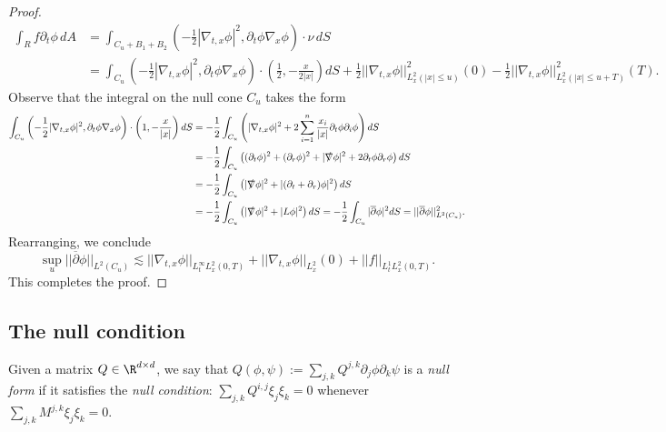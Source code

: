 \begin{proof}
		\begin{align*}
			\int_R f \partial_t \phi \, dA
				& = \int_{C_{u} + B_1 + B_2} \left( -\frac12 |\nabla_{t, x} \phi|^2, \partial_t \phi \nabla_x \phi \right) \cdot \nu \, dS \\
				&= \int_{C_{u}} \left( -\frac12 |\nabla_{t, x} \phi|^2, \partial_t \phi \nabla_x \phi \right) \cdot  \left( \frac12, -\frac{x}{2|x|} \right)  dS + \frac12 || \nabla_{t, x} \phi||^2_{L^2_x (|x| \leq u)} (0) - \frac12 ||\nabla_{t, x} \phi||_{L^2_x (|x| \leq u + T)}^2 (T).
		\end{align*}	
	Observe that the integral on the null cone $C_u$ takes the form
		\begin{align*}
			\int_{C_u} \left( -\frac12 |\nabla_{t, x} \phi|^2, \partial_t \phi \nabla_x \phi \right) \cdot \left( 1, -\frac{x}{|x|} \right) dS
				&= - \frac12 \int_{C_u} \left( |\nabla_{t, x} \phi|^2  + 2 \sum_{i = 1}^n \frac{x_i}{|x|} \partial_t \phi \partial_i \phi \right) dS \\
				&= - \frac12 \int_{C_u} \left( (\partial_t \phi)^2 + (\partial_r \phi)^2 + |\slashed \nabla \phi|^2 + 2\partial_t \phi \partial_r \phi\right) dS\\
				&= - \frac12 \int_{C_u} \left(|\slashed \nabla \phi|^2 + |(\partial_t + \partial_r) \phi|^2\right)  dS\\
				&= -\frac12 \int_{C_u} \left(|\slashed \nabla \phi|^2 + |L \phi|^2 \right)  dS = - \frac12 \int_{C_u} |\overline\partial \phi|^2 dS = ||\overline \partial \phi||_{L^2 (C_u)}^2.
		\end{align*}	
	Rearranging, we conclude
			\[  \sup_{u} ||\overline \partial \phi ||_{L^2 (C_u)} \lesssim || \nabla_{t, x} \phi ||_{L^\infty_t L^2_x (0, T)}  +  ||\nabla_{t, x} \phi||_{L^2_x} (0)+ ||f||_{L^1_t L^2_x (0, T)}.\]
	This completes the proof. 	
\end{proof}

\subsection{The null condition}

\begin{definition}
	Given a matrix $Q \in \R^{d \times d}$, we say that $Q(\phi, \psi) := \sum_{j, k} Q^{j, k} \partial_j \phi \partial_k \psi$ is a \emph{null form} if it satisfies the \emph{null condition}: $\sum_{j, k} Q^{i, j} \xi_j \xi_k = 0$ whenever $\sum_{j, k} M^{j, k} \xi_j \xi_k = 0$.
\end{definition}

